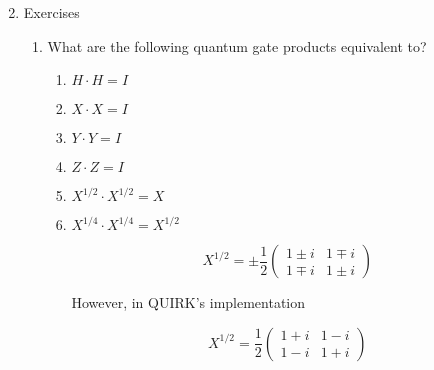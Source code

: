 \documentclass[11pt]{article}
\begin{document}
\begin{enumerate}[label*=\arabic*.]
\setcounter{enumi}{1}
    \item Exercises
    \begin{enumerate}[label*=\arabic*.]
        \item What are the following quantum gate products equivalent to?
        \begin{enumerate}[label=(\alph*)]
            \item $H\cdot H = I$
            \item $X\cdot X = I$
            \item $Y\cdot Y = I$
            \item $Z\cdot Z = I$
            \item $X^{1/2}\cdot X^{1/2} = X$
            \item $X^{1/4}\cdot X^{1/4} = X^{1/2} $

            $$
            X^{1/2} = \pm\frac{1}{2}
            \begin{pmatrix}
             1\pm i & 1\mp i \\
             1\mp i & 1\pm i
            \end{pmatrix}
            $$

            However, in QUIRK's implementation

            $$
            X^{1/2} = \frac{1}{2}
            \begin{pmatrix}
            1+i & 1-i \\
            1-i & 1+i
            \end{pmatrix}
            $$
            

\end{enumerate}
\end{enumerate}
\end{enumerate}
\end{document}
